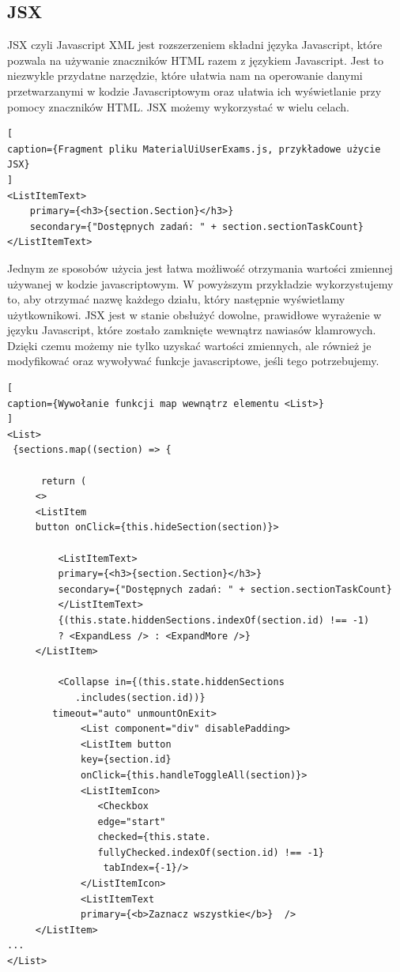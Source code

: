 \documentclass[oneside,polski,logo,indent]{amuthesis}
\begin{document}
\begin{enumerate}
\begin{enumerate}
\subsection{JSX}

{
JSX czyli Javascript XML jest rozszerzeniem składni języka Javascript, które pozwala na używanie znaczników HTML razem z językiem Javascript. Jest to niezwykle przydatne narzędzie, które ułatwia nam na operowanie danymi przetwarzanymi w kodzie Javascriptowym oraz ułatwia ich wyświetlanie przy pomocy znaczników HTML. JSX możemy wykorzystać w wielu celach.



\begin{lstlisting}[
caption={Fragment pliku MaterialUiUserExams.js, przykładowe użycie JSX}
]
<ListItemText>
	primary={<h3>{section.Section}</h3>}
	secondary={"Dostępnych zadań: " + section.sectionTaskCount}
</ListItemText>
\end{lstlisting}



Jednym ze sposobów użycia jest łatwa możliwość otrzymania wartości zmiennej używanej w kodzie javascriptowym. W powyższym przykładzie wykorzystujemy to, aby otrzymać nazwę każdego działu, który następnie wyświetlamy użytkownikowi.
JSX jest w stanie obsłużyć dowolne, prawidłowe wyrażenie w języku Javascript, które zostało zamknięte wewnątrz nawiasów klamrowych. Dzięki czemu możemy nie tylko uzyskać wartości zmiennych, ale również je modyfikować oraz wywoływać funkcje javascriptowe, jeśli tego potrzebujemy.



\begin{lstlisting}[
caption={Wywołanie funkcji map wewnątrz elementu <List>}
]
<List>
 {sections.map((section) => {
                     
	  return (
	 <>
	 <ListItem
	 button onClick={this.hideSection(section)}>

		 <ListItemText>
		 primary={<h3>{section.Section}</h3>}
		 secondary={"Dostępnych zadań: " + section.sectionTaskCount}
		 </ListItemText>
		 {(this.state.hiddenSections.indexOf(section.id) !== -1)
		 ? <ExpandLess /> : <ExpandMore />}
	 </ListItem>

		 <Collapse in={(this.state.hiddenSections
			.includes(section.id))} 
		timeout="auto" unmountOnExit>
			 <List component="div" disablePadding>
			 <ListItem button
			 key={section.id}
			 onClick={this.handleToggleAll(section)}>
			 <ListItemIcon>
			 	<Checkbox
			 	edge="start"
			 	checked={this.state.
				fullyChecked.indexOf(section.id) !== -1}
				 tabIndex={-1}/>
			 </ListItemIcon>
			 <ListItemText 
			 primary={<b>Zaznacz wszystkie</b>}  />
	 </ListItem>
...
</List>
\end{lstlisting}



}
\end{enumerate}
\end{enumerate}
\end{document}
